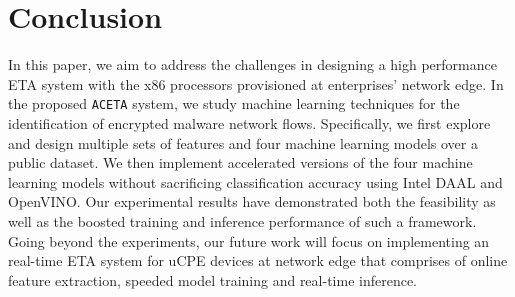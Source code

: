 \section{Conclusion}
\label{sec:concl}

In this paper, we aim to address the challenges in designing a high performance ETA system with the x86 processors provisioned at enterprises' network edge. In the proposed \texttt{ACETA} system, we study machine learning techniques for the identification of encrypted malware network flows. Specifically, we first explore and design multiple sets of features and four machine learning models over a public dataset. We then implement accelerated versions of the four machine learning models without sacrificing classification accuracy using Intel DAAL and OpenVINO. Our experimental results have demonstrated both the feasibility as well as the boosted training and inference performance of such a framework. Going beyond the experiments, our future work will focus on implementing an real-time ETA system for uCPE devices at network edge that comprises of online feature extraction, speeded model training and real-time inference. 
